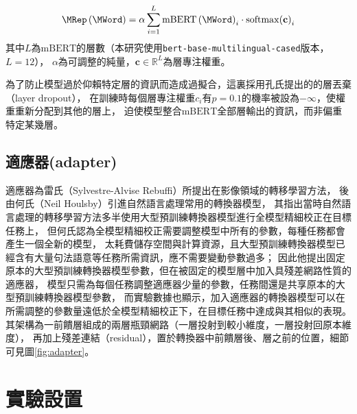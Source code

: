 \begin{equation}
    \MRep\left(\MWord\right) = \alpha \sum_{i=1}^{L} \mathrm{mBERT}\left(\MWord\right)_{i} \cdot \mathrm{softmax} {\left(\mathbf{c}\right)}_{i}
\end{equation}
其中$L$為$\mathrm{mBERT}$的層數（本研究使用\texttt{bert-base-multilingual-cased}版本，$L=12$），
$\alpha$為可調整的純量，$\mathbf{c} \in \mathbb{R}^{L}$為層專注權重。

為了防止模型過於仰賴特定層的資訊而造成過擬合，這裏採用孔氏提出的\cite{kondratyuk-straka-2019-75}的層丟棄（layer dropout），
在訓練時每個層專注權重$c_{i}$有$p=0.1$的機率被設為$-\infty$，使權重重新分配到其他的層上，
迫使模型整合$\mathrm{mBERT}$全部層輸出的資訊，而非偏重特定某幾層。

\subsection{適應器(adapter)}

適應器為雷氏（Sylvestre-Alvise Rebuffi）\cite{rebuffi2018efficient}所提出在影像領域的轉移學習方法，
後由何氏（Neil Houlsby）引進自然語言處理常用的轉換器模型\cite{houlsby2019parameter}，
其指出當時自然語言處理的轉移學習方法多半使用大型預訓練轉換器模型進行全模型精細校正在目標任務上，
但何氏認為全模型精細校正需要調整模型中所有的參數，每種任務都會產生一個全新的模型，
太耗費儲存空間與計算資源，且大型預訓練轉換器模型已經含有大量句法語意等任務所需資訊，應不需要變動參數過多；
因此他提出固定原本的大型預訓練轉換器模型參數，但在被固定的模型層中加入具殘差網路性質的適應器，
模型只需為每個任務調整適應器少量的參數，任務間還是共享原本的大型預訓練轉換器模型參數，
而實驗數據也顯示，加入適應器的轉換器模型可以在所需調整的參數量遠低於全模型精細校正下，在目標任務中達成與其相似的表現。
其架構為一前饋層組成的兩層瓶頸網路（一層投射到較小維度，一層投射回原本維度），
再加上殘差連結（residual），置於轉換器中前饋層後、層\XNorm 之前的位置，細節可見圖\ref{fig:adapter}。
%

\section{實驗設置}



